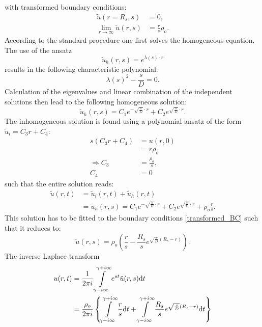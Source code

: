 with transformed boundary conditions:
\begin{align}
    \tilde{u}(r=R_s,s) &= 0, \nonumber \\
    \lim\limits_{r\rightarrow \infty} \tilde{u}(r,s) &= \frac{r}{s}\rho_o.
    \label{transformed_BC}
\end{align}
According to the standard procedure one first solves the homogeneous equation. The use of the ansatz
\begin{equation}
    \tilde{u}_{h}(r,s) = e^{\lambda(s) \cdot r}
\end{equation}
results in the following characteristic polynomial:
\begin{equation}
    \lambda(s) ^2 - \frac{s}{D} = 0.
    \label{characteristic_polynomial}
\end{equation}
Calculation of the eigenvalues and linear combination of the independent solutions then lead to the following homogeneous solution:
\begin{equation}
    \tilde{u}_h(r,s) = C_1 e^{ - \sqrt{\frac{s}{D}} \cdot r } + C_2 e^{ \sqrt{\frac{s}{D}} \cdot r }.
    \label{u_h}
\end{equation}
The inhomogeneous solution is found using a polynomial ansatz of the form $\tilde{u}_i = C_3 r + C_4$:
\begin{align}
    s(C_3 r + C_4)  &= u(r,0)\nonumber\\
                    &= r \rho_o \nonumber\\
    \Rightarrow C_3 &= \frac{\rho_o}{s}, \nonumber\\
                C_4 &= 0
\end{align}
such that the entire solution reads:
\begin{align}
    \tilde{u}(r,t)&=\tilde{u}_{i}(r,t)+\tilde{u}_{h}(r,t) \nonumber \\
    &= \tilde{u}_h(r,s) = C_1 e^{ - \sqrt{\frac{s}{D}} \cdot r } + C_2 e^{ \sqrt{\frac{s}{D}} \cdot r } + \rho_o\frac{r}{s} .
\end{align}
This solution has to be fitted to the boundary conditions \eqref{transformed_BC} such that it reduces to:
\begin{equation}
    \tilde{u}(r,s) = \rho_o \left( \frac{r}{s} - \frac{R_s}{s} e^{ \sqrt{\frac{s}{D}}(R_s - r) } \right) .
\end{equation}
The inverse Laplace transform
\begin{align}
    u(r,t)  &= \frac{1}{2 \pi i} \int\limits_{\gamma - i \infty}^{\gamma + i \infty}  e^{st} \tilde{u}(r,s){\rm d}t \\
    &= \frac{\rho_o}{ 2 \pi i} \left\{  \int\limits_{\gamma - i \infty}^{\gamma + i \infty} \frac{r}{s}  {\rm d}t +  \int\limits_{\gamma - i \infty}^{\gamma + i \infty}\frac{R_s}{s} e^{ \sqrt{\frac{s}{D}}(R_s - r) }  {\rm d}t \right\}
    \label{inverse laplace}
\end{align}
